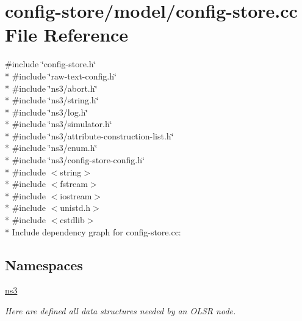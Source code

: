 \hypertarget{config-store_8cc}{}\section{config-\/store/model/config-\/store.cc File Reference}
\label{config-store_8cc}
{\ttfamily \#include \char`\"{}config-\/store.\+h\char`\"{}}\\*
{\ttfamily \#include \char`\"{}raw-\/text-\/config.\+h\char`\"{}}\\*
{\ttfamily \#include \char`\"{}ns3/abort.\+h\char`\"{}}\\*
{\ttfamily \#include \char`\"{}ns3/string.\+h\char`\"{}}\\*
{\ttfamily \#include \char`\"{}ns3/log.\+h\char`\"{}}\\*
{\ttfamily \#include \char`\"{}ns3/simulator.\+h\char`\"{}}\\*
{\ttfamily \#include \char`\"{}ns3/attribute-\/construction-\/list.\+h\char`\"{}}\\*
{\ttfamily \#include \char`\"{}ns3/enum.\+h\char`\"{}}\\*
{\ttfamily \#include \char`\"{}ns3/config-\/store-\/config.\+h\char`\"{}}\\*
{\ttfamily \#include $<$string$>$}\\*
{\ttfamily \#include $<$fstream$>$}\\*
{\ttfamily \#include $<$iostream$>$}\\*
{\ttfamily \#include $<$unistd.\+h$>$}\\*
{\ttfamily \#include $<$cstdlib$>$}\\*
Include dependency graph for config-\/store.cc\+:
\subsection*{Namespaces}
\begin{DoxyCompactItemize}
\item 
 \hyperlink{namespacens3}{ns3}
\begin{DoxyCompactList}\small\item\em Here are defined all data structures needed by an O\+L\+SR node. \end{DoxyCompactList}\end{DoxyCompactItemize}

